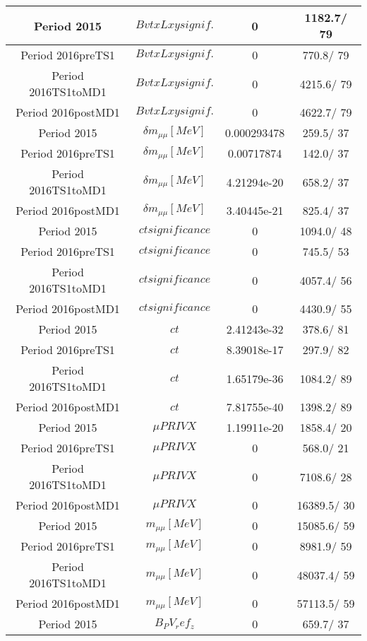 \documentclass{article}
\begin{document}
\begin{longtable}{c|c|c|c}
\hline
 Period 2015 & $BvtxLxy signif.$ & 0 & 1182.7/ 79\\
\hline
 Period 2016preTS1 & $BvtxLxy signif.$ & 0 & 770.8/ 79\\
\hline
 Period 2016TS1toMD1 & $BvtxLxy signif.$ & 0 & 4215.6/ 79\\
\hline
 Period 2016postMD1 & $BvtxLxy signif.$ & 0 & 4622.7/ 79\\
\hline
 Period 2015 & $\delta m_{\mu\mu} [MeV]$ & 0.000293478 & 259.5/ 37\\
\hline
 Period 2016preTS1 & $\delta m_{\mu\mu} [MeV]$ & 0.00717874 & 142.0/ 37\\
\hline
 Period 2016TS1toMD1 & $\delta m_{\mu\mu} [MeV]$ & 4.21294e-20 & 658.2/ 37\\
\hline
 Period 2016postMD1 & $\delta m_{\mu\mu} [MeV]$ & 3.40445e-21 & 825.4/ 37\\
\hline
 Period 2015 & $ct significance$ & 0 & 1094.0/ 48\\
\hline
 Period 2016preTS1 & $ct significance$ & 0 & 745.5/ 53\\
\hline
 Period 2016TS1toMD1 & $ct significance$ & 0 & 4057.4/ 56\\
\hline
 Period 2016postMD1 & $ct significance$ & 0 & 4430.9/ 55\\
\hline
 Period 2015 & $ct$ & 2.41243e-32 & 378.6/ 81\\
\hline
 Period 2016preTS1 & $ct$ & 8.39018e-17 & 297.9/ 82\\
\hline
 Period 2016TS1toMD1 & $ct$ & 1.65179e-36 & 1084.2/ 89\\
\hline
 Period 2016postMD1 & $ct$ & 7.81755e-40 & 1398.2/ 89\\
\hline
 Period 2015 & $\mu PRIVX$ & 1.19911e-20 & 1858.4/ 20\\
\hline
 Period 2016preTS1 & $\mu PRIVX$ & 0 & 568.0/ 21\\
\hline
 Period 2016TS1toMD1 & $\mu PRIVX$ & 0 & 7108.6/ 28\\
\hline
 Period 2016postMD1 & $\mu PRIVX$ & 0 & 16389.5/ 30\\
\hline
 Period 2015 & $m_{\mu\mu} [MeV]$ & 0 & 15085.6/ 59\\
\hline
 Period 2016preTS1 & $m_{\mu\mu} [MeV]$ & 0 & 8981.9/ 59\\
\hline
 Period 2016TS1toMD1 & $m_{\mu\mu} [MeV]$ & 0 & 48037.4/ 59\\
\hline
 Period 2016postMD1 & $m_{\mu\mu} [MeV]$ & 0 & 57113.5/ 59\\
\hline
 Period 2015 & $B_PV_ref_z$ & 0 & 659.7/ 37\\

\end{longtable}
\end{document}
